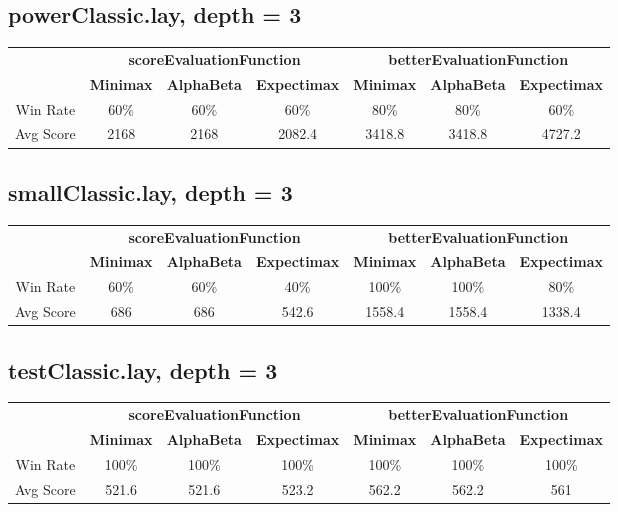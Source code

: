 \documentclass[english, a4paper,12pt]{article}
\begin{document}
\subsection*{powerClassic.lay, depth = 3}
\small\begin{tabular}{|c|c|c|c|c|c|c|}
\hline
\text{ } & \multicolumn{3}{c|}{\textbf{scoreEvaluationFunction}} & \multicolumn{3}{c|}{\textbf{betterEvaluationFunction}} \\
\cline{2-7}
& \textbf{Minimax} & \textbf{AlphaBeta} & \textbf{Expectimax} & \textbf{Minimax} & \textbf{AlphaBeta} & \textbf{Expectimax} \\
\hline
Win Rate & 60\% & 60\% & 60\% & 80\% & 80\% & 60\%\\
Avg Score & 2168 & 2168 & 2082.4 & 3418.8 & 3418.8 & 4727.2\\ 
\hline
\end{tabular}

\subsection*{smallClassic.lay, depth = 3}
\small\begin{tabular}{|c|c|c|c|c|c|c|}
\hline
\text{ } & \multicolumn{3}{c|}{\textbf{scoreEvaluationFunction}} & \multicolumn{3}{c|}{\textbf{betterEvaluationFunction}} \\
\cline{2-7}
& \textbf{Minimax} & \textbf{AlphaBeta} & \textbf{Expectimax} & \textbf{Minimax} & \textbf{AlphaBeta} & \textbf{Expectimax} \\
\hline
Win Rate & 60\% & 60\% & 40\% & 100\% & 100\% & 80\%\\
Avg Score & 686 & 686 & 542.6 & 1558.4 & 1558.4 & 1338.4\\ 
\hline
\end{tabular}

\subsection*{testClassic.lay, depth = 3}
\small\begin{tabular}{|c|c|c|c|c|c|c|}
\hline
\text{ } & \multicolumn{3}{c|}{\textbf{scoreEvaluationFunction}} & \multicolumn{3}{c|}{\textbf{betterEvaluationFunction}} \\
\cline{2-7}
& \textbf{Minimax} & \textbf{AlphaBeta} & \textbf{Expectimax} & \textbf{Minimax} & \textbf{AlphaBeta} & \textbf{Expectimax} \\
\hline
Win Rate & 100\% & 100\% & 100\% & 100\% & 100\% & 100\%\\
Avg Score & 521.6 & 521.6 & 523.2 & 562.2 & 562.2 & 561\\ 
\hline
\end{tabular}
\end{document}
